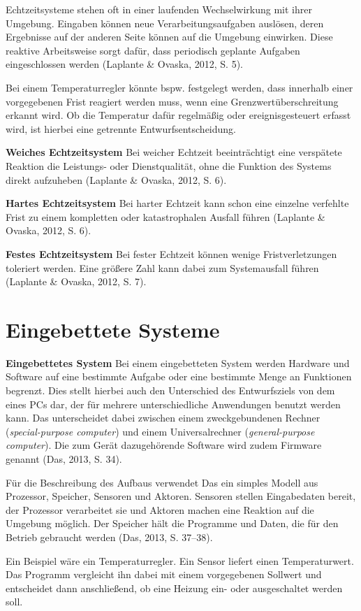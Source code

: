 Echtzeitsysteme stehen oft in einer laufenden Wechselwirkung mit ihrer Umgebung. Eingaben können neue Verarbeitungsaufgaben auslösen, deren Ergebnisse auf der anderen Seite können auf die Umgebung einwirken. Diese reaktive Arbeitsweise sorgt dafür, dass periodisch geplante Aufgaben eingeschlossen werden (Laplante \& Ovaska, 2012, S. 5).

Bei einem Temperaturregler könnte bspw. festgelegt werden, dass innerhalb einer vorgegebenen Frist reagiert werden muss, wenn eine Grenzwertüberschreitung erkannt wird. Ob die Temperatur dafür regelmäßig oder ereignisgesteuert erfasst wird, ist hierbei eine getrennte Entwurfsentscheidung.

\textbf{Weiches Echtzeitsystem} Bei weicher Echtzeit beeinträchtigt eine verspätete Reaktion die Leistungs- oder Dienstqualität, ohne die Funktion des Systems direkt aufzuheben (Laplante \& Ovaska, 2012, S. 6).

\textbf{Hartes Echtzeitsystem} Bei harter Echtzeit kann schon eine einzelne verfehlte Frist zu einem kompletten oder katastrophalen Ausfall führen (Laplante \& Ovaska, 2012, S. 6).

\textbf{Festes Echtzeitsystem} Bei fester Echtzeit können wenige Fristverletzungen toleriert werden. Eine größere Zahl kann dabei zum Systemausfall führen (Laplante \& Ovaska, 2012, S. 7).

\section{Eingebettete Systeme}
\textbf{Eingebettetes System} Bei einem eingebetteten System werden Hardware und Software auf eine bestimmte Aufgabe oder eine bestimmte Menge an Funktionen begrenzt. Dies stellt hierbei auch den Unterschied des Entwurfsziels von dem eines PCs dar, der für mehrere unterschiedliche Anwendungen benutzt werden kann. Das unterscheidet dabei zwischen einem zweckgebundenen Rechner (\emph{special-purpose computer}) und einem Universalrechner (\emph{general-purpose computer}). Die zum Gerät dazugehörende Software wird zudem Firmware genannt (Das, 2013, S. 34).

Für die Beschreibung des Aufbaus verwendet Das ein simples Modell aus Prozessor, Speicher, Sensoren und Aktoren. Sensoren stellen Eingabedaten bereit, der Prozessor verarbeitet sie und Aktoren machen eine Reaktion auf die Umgebung möglich. Der Speicher hält die Programme und Daten, die für den Betrieb gebraucht werden (Das, 2013, S. 37–38).

Ein Beispiel wäre ein Temperaturregler. Ein Sensor liefert einen Temperaturwert. Das Programm vergleicht ihn dabei mit einem vorgegebenen Sollwert und entscheidet dann anschließend, ob eine Heizung ein- oder ausgeschaltet werden soll.

